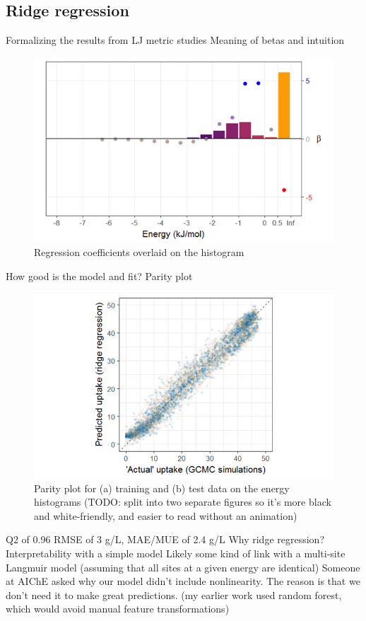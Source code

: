 \documentclass[letterpaper]{article}
\begin{document}
\subsection{Ridge regression}
\begin{outline}
	\1 Formalizing the results from LJ metric studies
	\1 Meaning of betas and intuition
	\begin{figure}[!ht]
		\centering
		\includegraphics[width=0.75\columnwidth]{Figs/betas.png}
		\caption{Regression coefficients overlaid on the histogram}
		\label{fig:betas}
	\end{figure}
	\1 How good is the model and fit?
		\2 Parity plot
		\begin{figure}[!ht]
			\centering
			\includegraphics[width=0.75\columnwidth]{Figs/parity.png}
			\caption{Parity plot for (a) training and (b) test data on the energy histograms (TODO: split into two separate figures so it's more black and white-friendly, and easier to read without an animation)}
			\label{fig:parity}
		\end{figure}
		\2 Q2 of 0.96
		\2 RMSE of 3 g/L, MAE/MUE of 2.4 g/L
	\1 Why ridge regression?
		\2 Interpretability with a simple model
		\2 Likely some kind of link with a multi-site Langmuir model (assuming that all sites at a given energy are identical)
		\2 Someone at AIChE asked why our model didn't include nonlinearity.  The reason is that we don't need it to make great predictions. (my earlier work used random forest, which would avoid manual feature transformations)
\end{outline}
\end{document}
